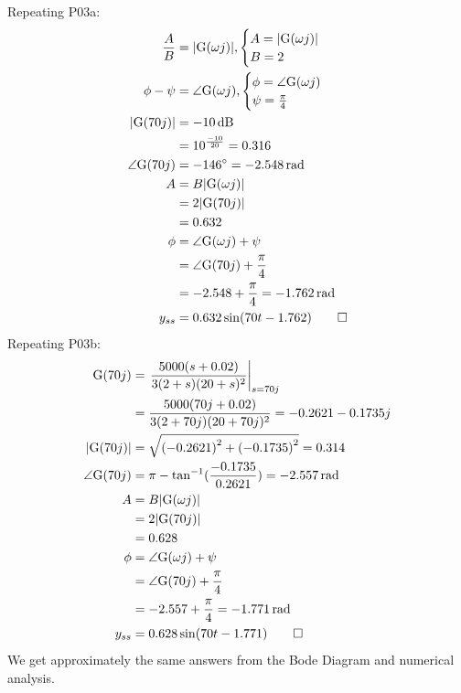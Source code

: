\begin{hwkProblem}{3}{}
	Repeating P03a:
	\begin{align*}
		\frac{A}{B} &= |\func{G}[\omega j]|,
		\begin{cases}
			A = |\func{G}[\omega j]| \\
			B = 2 \\
		\end{cases} \\
		\phi - \psi &= \angle \func{G}[\omega j],
		\begin{cases}
			\phi = \angle \func{G}[\omega j] \\
			\psi = \frac{\pi}{4} \\
		\end{cases} \\
		|\func{G}[70j]| &= \qty{-10}{\decibel} \\
				&= 10^{\frac{-10}{20}} = 0.316 \\
		\angle \func{G}[70j] &= \qty{-146}{\degree} = \qty{-2.548}{\radian} \\
		A &= B |\func{G}[\omega j]| \\
		  &= 2 |\func{G}[70 j]| \\
		  &= 0.632 \\
		\phi &= \angle \func{G}[\omega j] + \psi \\
		     &= \angle \func{G}[70 j] + \frac{\pi}{4} \\
		     &= -2.548 + \frac{\pi}{4} = \qty{-1.762}{\radian} \\
		y_{ss} &= 0.632 \sin(70 t - 1.762) \qed
	\end{align*}
	Repeating P03b:
	\begin{align*}
		\func{G}[70j] &= \left. \frac{5000(s+0.02)}{3(2+s)(20+s)^{2}}\right|_{s=70j} \\
			      &= \frac{5000(70j+0.02)}{3(2+70j)(20+70j)^{2}} = -0.2621 - 0.1735j \\
		|\func{G}[70j]| &= \sqrt{\left(-0.2621\right)^{2}+\left(-0.1735\right)^{2}} = 0.314 \\
		\angle \func{G}[70j] &= \pi - \tan^{-1}(\frac{-0.1735}{0.2621}) = \qty{-2.557}{\radian} \\
		A &= B |\func{G}[\omega j]| \\
		  &= 2 |\func{G}[70 j]| \\
		  &= 0.628 \\
		\phi &= \angle \func{G}[\omega j] + \psi \\
		     &= \angle \func{G}[70 j] + \frac{\pi}{4} \\
		     &= -2.557 + \frac{\pi}{4} = \qty{-1.771}{\radian} \\
		y_{ss} &= 0.628 \sin(70 t - 1.771) \qed
	\end{align*}
	We get approximately the same answers from the Bode Diagram and numerical analysis.


\end{hwkProblem}
